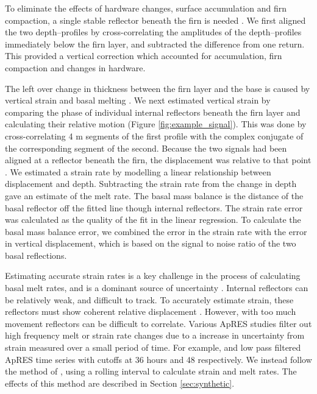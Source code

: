 To eliminate the effects of hardware changes, surface accumulation and firn compaction, a single stable reflector beneath the firn is needed \cite{jenkins2006interactions}. 
We first aligned the two depth--profiles by cross-correlating the amplitudes of the depth--profiles immediately below the firn layer, and subtracted the difference from one return. This provided a vertical correction which accounted for accumulation, firn compaction and changes in hardware. 
 
The left over change in thickness between the firn layer and the base is caused by vertical strain and basal melting \citep{nicholls2015ground}. 
We next estimated vertical strain by comparing the phase of individual internal reflectors beneath the firn layer and calculating their relative motion (Figure \ref{fig:example_signal}). This was done by cross-correlating 4 m segments of the first profile with the complex conjugate of the corresponding segment of the second. Because the two signals had been aligned at a reflector beneath the firn, the displacement was relative to that point  \citep{nicholls2015ground}. We estimated a strain rate by modelling a linear relationship between displacement and depth. Subtracting the strain rate from the change in depth gave an estimate of the melt rate. 
The basal mass balance is the distance of the basal reflector off the fitted line though internal reflectors.
The strain rate error was calculated as the quality of the fit in the linear regression.  
To calculate the basal mass balance error, we combined the error in the strain rate with the error in vertical displacement, which is based on the signal to noise ratio of the two basal reflections.

Estimating accurate strain rates is a key challenge in the process of calculating basal melt rates, and is a dominant source of uncertainty  \citep{vavnkova2020observations}. Internal reflectors can be relatively weak, and difficult to track. To accurately estimate strain, these reflectors must show coherent relative displacement \citep{lindback2019spatial}. However, with too much movement reflectors can be difficult to correlate.  Various ApRES studies filter out high frequency melt or strain rate changes due to a increase in uncertainty from strain measured over a small period of time. For example, \cite{lindback2019spatial} and \cite{davis2018variability} low pass filtered ApRES time series with cutoffs at 36 hours and 48 respectively. We instead follow the method of \cite{sun2019topographic}, using a rolling interval to calculate strain and melt rates.  The effects of this method are described in Section \ref{sec:synthetic}.

